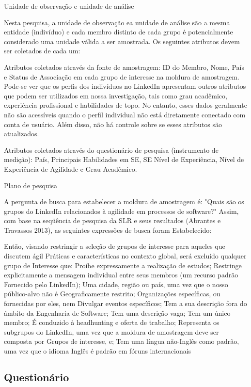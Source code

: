 Unidade de observação e unidade de análise

Nesta pesquisa, a unidade de observação ea unidade de análise são a mesma
entidade (indivíduo) e cada membro distinto de cada grupo é potencialmente
considerado uma unidade válida a ser amostrada. Os seguintes atributos devem ser
coletados de cada um:

Atributos coletados através da fonte de amostragem: ID do Membro, Nome, País e
Status de Associação em cada grupo de interesse na moldura de amostragem.
Pode-se ver que os perfis dos indivíduos no LinkedIn apresentam outros atributos
que podem ser utilizados em nossa investigação, tais como grau acadêmico,
experiência profissional e habilidades de topo. No entanto, esses dados
geralmente não são acessíveis quando o perfil individual não está diretamente
conectado com conta de usuário. Além disso, não há controle sobre se esses
atributos são atualizados.

Atributos coletados através do questionário de pesquisa (instrumento de
medição): País, Principais Habilidades em SE, SE Nível de Experiência, Nível de
Experiência de Agilidade e Grau Acadêmico.

Plano de pesquisa


A pergunta de busca para estabelecer a moldura de amostragem é: "Quais são os
grupos do LinkedIn relacionados à agilidade em processos de software?" Assim,
com base na seqüência de pesquisa da SLR e seus resultados (Abrantes e Travassos
2013), as seguintes expressões de busca foram Estabelecido:


Então, visando restringir a seleção de grupos de interesse para aqueles que
discutem ágil Práticas e características no contexto global, será excluído
qualquer grupo de Interesse que:
Proíbe expressamente a realização de estudos;
Restringe explicitamente a mensagem individual entre seus membros (um recurso padrão
Fornecido pelo LinkedIn);
Uma cidade, região ou país, uma vez que o nosso público-alvo não é
Geograficamente restrito;
Organizações específicas, ou fornecidas por eles, nem
Divulgar eventos específicos;
Tem a sua descrição fora do âmbito da Engenharia de Software;
Tem uma descrição vaga;
Tem um único membro;
É conduzido à headhunting e oferta de trabalho;
Representa os subgrupos do LinkedIn, uma vez que a moldura de amostragem deve
ser composta por Grupos de interesse, e; Tem uma língua não-Inglês como padrão,
uma vez que o idioma Inglês é padrão em fóruns internacionais

\subsection{Questionário}
\label{subsec:questionario}

